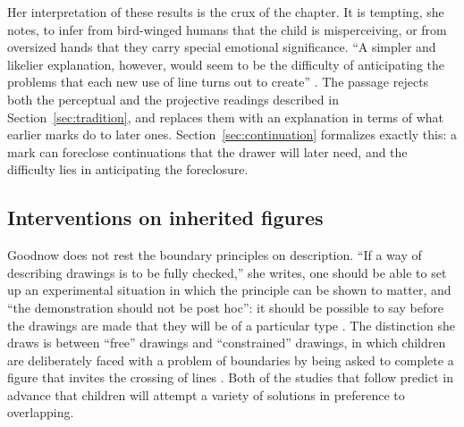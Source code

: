 \documentclass[11pt]{article}
\theoremstyle{remark}
\begin{document}
Her interpretation of these results is the crux of the chapter. It is tempting, she notes, to infer from bird-winged humans that the child is misperceiving, or from oversized hands that they carry special emotional significance. ``A simpler and likelier explanation, however, would seem to be the difficulty of anticipating the problems that each new use of line turns out to create'' \cite[p.~48]{goodnow1977}. The passage rejects both the perceptual and the projective readings described in Section~\ref{sec:tradition}, and replaces them with an explanation in terms of what earlier marks do to later ones. Section~\ref{sec:continuation} formalizes exactly this: a mark can foreclose continuations that the drawer will later need, and the difficulty lies in anticipating the foreclosure.

\subsection{Interventions on inherited figures}

Goodnow does not rest the boundary principles on description. ``If a way of describing drawings is to be fully checked,'' she writes, one should be able to set up an experimental situation in which the principle can be shown to matter, and ``the demonstration should not be post hoc'': it should be possible to say before the drawings are made that they will be of a particular type \cite[pp.~49--50]{goodnow1977}. The distinction she draws is between ``free'' drawings and ``constrained'' drawings, in which children are deliberately faced with a problem of boundaries by being asked to complete a figure that invites the crossing of lines \cite[p.~44]{goodnow1977}. Both of the studies that follow predict in advance that children will attempt a variety of solutions in preference to overlapping.
\end{document}
